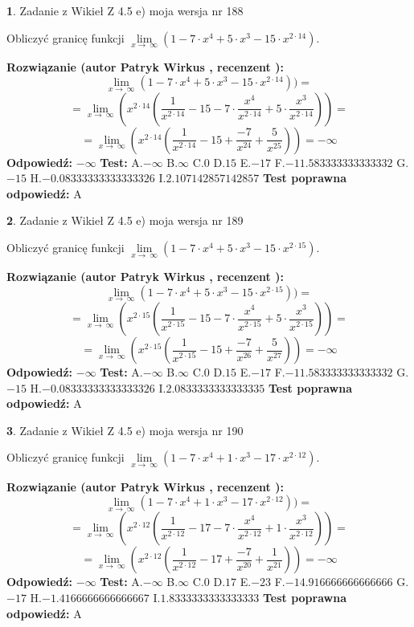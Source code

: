 \documentclass[12pt, a4paper]{article}
\theoremstyle{definition} %
\newtheorem{zad}{}
\newcommand{\zadStart}[1]{\begin{zad}#1\newline}
\newcommand{\zadStop}{\end{zad}}
\newcommand{\rozwStart}[2]{\noindent \textbf{Rozwiązanie (autor #1 , recenzent #2): }\newline}
\newcommand{\rozwStop}{\newline}
\newcommand{\odpStart}{\noindent \textbf{Odpowiedź:}\newline}
\newcommand{\odpStop}{\newline}
\newcommand{\testStart}{\noindent \textbf{Test:}\newline}
\newcommand{\testStop}{\newline}
\newcommand{\kluczStart}{\noindent \textbf{Test poprawna odpowiedź:}\newline}
\newcommand{\kluczStop}{\newline}
\begin{document}
\zadStart{Zadanie z Wikieł Z 4.5 e) moja wersja nr 188}


Obliczyć granicę funkcji  $\lim\limits_{x\to\ \infty}(1 - 7 \cdot x^{4}+5 \cdot x^{3}- 15 \cdot x^{2\cdot14})$.
\zadStop
\rozwStart{Patryk Wirkus}{}
$$\lim\limits_{x\to\ \infty}(1 - 7 \cdot x^{4}+5 \cdot x^{3}- 15 \cdot x^{2\cdot14}))=$$
$$=\lim\limits_{x\to\ \infty}(x^{2\cdot14}(\frac{1}{x^{2\cdot14}}-15 -7 \cdot \frac{x^{4}}{x^{2\cdot14}}+5 \cdot \frac{x^{3}}{x^{2\cdot14}}))=$$
$$=\lim\limits_{x\to\ \infty}(x^{2\cdot14}(\frac{1}{x^{2\cdot14}}-15 + \frac{-7}{x^{24}}+ \frac{5}{x^{25}}))=-\infty$$
\rozwStop
\odpStart
$-\infty$
\odpStop
\testStart
A.$-\infty$ B.$\infty$ C.$0$ D.$15$ E.$-17$
F.$-11.583333333333332$ G.$-15$
H.$-0.08333333333333326$
I.$2.107142857142857$
\testStop
\kluczStart
A
\kluczStop



\zadStart{Zadanie z Wikieł Z 4.5 e) moja wersja nr 189}


Obliczyć granicę funkcji  $\lim\limits_{x\to\ \infty}(1 - 7 \cdot x^{4}+5 \cdot x^{3}- 15 \cdot x^{2\cdot15})$.
\zadStop
\rozwStart{Patryk Wirkus}{}
$$\lim\limits_{x\to\ \infty}(1 - 7 \cdot x^{4}+5 \cdot x^{3}- 15 \cdot x^{2\cdot15}))=$$
$$=\lim\limits_{x\to\ \infty}(x^{2\cdot15}(\frac{1}{x^{2\cdot15}}-15 -7 \cdot \frac{x^{4}}{x^{2\cdot15}}+5 \cdot \frac{x^{3}}{x^{2\cdot15}}))=$$
$$=\lim\limits_{x\to\ \infty}(x^{2\cdot15}(\frac{1}{x^{2\cdot15}}-15 + \frac{-7}{x^{26}}+ \frac{5}{x^{27}}))=-\infty$$
\rozwStop
\odpStart
$-\infty$
\odpStop
\testStart
A.$-\infty$ B.$\infty$ C.$0$ D.$15$ E.$-17$
F.$-11.583333333333332$ G.$-15$
H.$-0.08333333333333326$
I.$2.0833333333333335$
\testStop
\kluczStart
A
\kluczStop



\zadStart{Zadanie z Wikieł Z 4.5 e) moja wersja nr 190}


Obliczyć granicę funkcji  $\lim\limits_{x\to\ \infty}(1 - 7 \cdot x^{4}+1 \cdot x^{3}- 17 \cdot x^{2\cdot12})$.
\zadStop
\rozwStart{Patryk Wirkus}{}
$$\lim\limits_{x\to\ \infty}(1 - 7 \cdot x^{4}+1 \cdot x^{3}- 17 \cdot x^{2\cdot12}))=$$
$$=\lim\limits_{x\to\ \infty}(x^{2\cdot12}(\frac{1}{x^{2\cdot12}}-17 -7 \cdot \frac{x^{4}}{x^{2\cdot12}}+1 \cdot \frac{x^{3}}{x^{2\cdot12}}))=$$
$$=\lim\limits_{x\to\ \infty}(x^{2\cdot12}(\frac{1}{x^{2\cdot12}}-17 + \frac{-7}{x^{20}}+ \frac{1}{x^{21}}))=-\infty$$
\rozwStop
\odpStart
$-\infty$
\odpStop
\testStart
A.$-\infty$ B.$\infty$ C.$0$ D.$17$ E.$-23$
F.$-14.916666666666666$ G.$-17$
H.$-1.4166666666666667$
I.$1.8333333333333333$
\testStop
\kluczStart
A
\kluczStop
\end{document}
